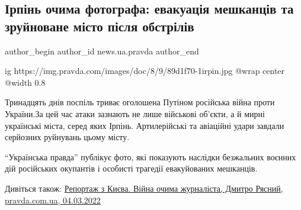  
 
 
 
 
 
\subsection{Ірпінь очима фотографа: евакуація мешканців та зруйноване місто після обстрілів}
\label{sec:09_03_2022.stz.news.ua.pravda.1.irpen}
 
\ifcmt
 author_begin
   author_id news.ua.pravda
 author_end
\fi

\ifcmt
  ig https://img.pravda.com/images/doc/8/9/89d1f70-1irpin.jpg
  @wrap center
  @width 0.8
\fi

\begin{zznagolos}
Тринадцять днів поспіль триває оголошена Путіном російська війна проти
України.За цей час атаки зазнають не лише військові об'єкти, а й мирні
українські міста, серед яких Ірпінь. Артилерійські та авіаційні удари завдали
серйозних руйнувань цьому місту.

\enquote{Українська правда} публікує фото, які показують наслідки безжальних
воєнних дій російських окупантів і особисті трагедії евакуйованих мешканців.
\end{zznagolos}

Дивіться також: \hyperlink{04_03_2022.stz.news.ua.pravda.1.reportazh_z_kieva}{%
Репортаж з Києва. Війна очима журналіста, Дмитро Рясний, pravda.com.ua, 04.03.2022%
} 










